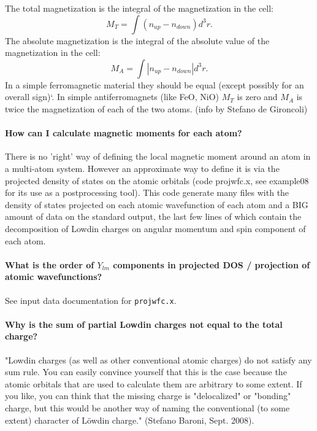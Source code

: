 \documentclass[12pt,a4paper]{article}
\begin{document}
The total magnetization is the integral of the magnetization
in the cell: 
$$
M_T = \int (n_{up}-n_{down}) d^3r.
$$
The absolute magnetization is the integral of the absolute value of
the magnetization in the cell:
$$
M_A= \int |n_{up}-n_{down}| d^3r.
$$
In a simple ferromagnetic material they should be equal (except
possibly for an overall sign)`. In simple antiferromagnets (like FeO,
NiO) $M_T$ is zero and $M_A$ is twice the magnetization of each of the
two atoms. (info by Stefano de Gironcoli) 

\paragraph{How can I calculate magnetic moments for each atom?} 

There is no 'right' way of defining the local magnetic moment
around an atom in a multi-atom system. However an approximate way to define
it is via the projected density of states on the atomic orbitals (code
projwfc.x, see example08 for its use as a postprocessing tool). This
code generate many files with the density of states projected on each
atomic wavefunction of each atom and a BIG amount of data on the
standard output, the last few lines of which contain the decomposition
of Lowdin charges on angular momentum and spin component of each atom.

\paragraph{What is the order of $Y_{lm}$ components in projected
  DOS / projection of atomic wavefunctions?}

See input data documentation for \texttt{projwfc.x}.

\paragraph{Why is the sum of partial Lowdin charges not equal to
  the total charge?} 

"Lowdin charges (as well as other conventional atomic charges) do not
satisfy any sum rule. You can easily convince yourself that this is the
case because the atomic orbitals that are used to calculate them are
arbitrary to some extent. If you like, you can think that the missing
charge is "delocalized" or "bonding" charge, but this would be another
way of naming the conventional (to some extent) character of L\"owdin
charge." (Stefano Baroni, Sept. 2008).  
\end{document}
